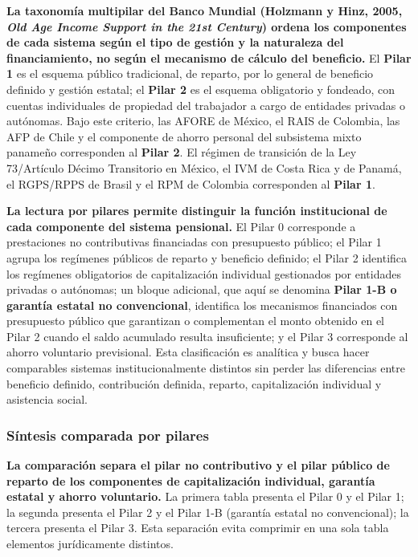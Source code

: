 \documentclass[12pt, letterpaper]{article}
\begin{document}
\textbf{La taxonomía multipilar del Banco Mundial (Holzmann y Hinz, 2005, \textit{Old Age Income Support in the 21st Century}) ordena los componentes de cada sistema según el tipo de gestión y la naturaleza del financiamiento, no según el mecanismo de cálculo del beneficio.} El \textbf{Pilar 1} es el esquema público tradicional, de reparto, por lo general de beneficio definido y gestión estatal; el \textbf{Pilar 2} es el esquema obligatorio y fondeado, con cuentas individuales de propiedad del trabajador a cargo de entidades privadas o autónomas. Bajo este criterio, las AFORE de México, el RAIS de Colombia, las AFP de Chile y el componente de ahorro personal del subsistema mixto panameño corresponden al \textbf{Pilar 2}. El régimen de transición de la Ley 73/Artículo Décimo Transitorio en México, el IVM de Costa Rica y de Panamá, el RGPS/RPPS de Brasil y el RPM de Colombia corresponden al \textbf{Pilar 1}.

\textbf{La lectura por pilares permite distinguir la función institucional de cada componente del sistema pensional.} El Pilar 0 corresponde a prestaciones no contributivas financiadas con presupuesto público; el Pilar 1 agrupa los regímenes públicos de reparto y beneficio definido; el Pilar 2 identifica los regímenes obligatorios de capitalización individual gestionados por entidades privadas o autónomas; un bloque adicional, que aquí se denomina \textbf{Pilar 1-B o garantía estatal no convencional}, identifica los mecanismos financiados con presupuesto público que garantizan o complementan el monto obtenido en el Pilar 2 cuando el saldo acumulado resulta insuficiente; y el Pilar 3 corresponde al ahorro voluntario previsional. Esta clasificación es analítica y busca hacer comparables sistemas institucionalmente distintos sin perder las diferencias entre beneficio definido, contribución definida, reparto, capitalización individual y asistencia social.

\subsubsection*{Síntesis comparada por pilares}

\textbf{La comparación separa el pilar no contributivo y el pilar público de reparto de los componentes de capitalización individual, garantía estatal y ahorro voluntario.} La primera tabla presenta el Pilar 0 y el Pilar 1; la segunda presenta el Pilar 2 y el Pilar 1-B (garantía estatal no convencional); la tercera presenta el Pilar 3. Esta separación evita comprimir en una sola tabla elementos jurídicamente distintos.
\end{document}
